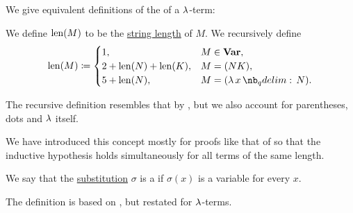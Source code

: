 \begin{definition}\label{def:lambda_term_length}
  We give equivalent definitions of the  of a \( \mathrm{\lambda} \)-term:
  \begin{thmenum}
     We define \( \operatorname{len}(M) \) to be the \hyperref[def:alphabet/length]{string length} of \( M \).
     We recursively define
    \begin{equation*}
      \len(M) \coloneqq \begin{cases}
        1,                     &M \in \op*{Var}, \\
        2 + \len(N) + \len(K), &M = (NK), \\
        5 + \len(N),           &M = (\qabs x N). \\
      \end{cases}
    \end{equation*}
  \end{thmenum}
\end{definition}
\begin{comments}
  \item The recursive definition resembles that by , but we also account for parentheses, dots and \( \mathrm{\lambda} \) itself.
  \item We have introduced this concept mostly for proofs like that of  so that the inductive hypothesis holds simultaneously for all terms of the same length.
\end{comments}

\begin{definition}\label{def:lambda_renaming}
  We say that the \hyperref[def:lambda_substitution]{substitution} \( \sigma \) is a  if \( \sigma(x) \) is a variable for every \( x \).
\end{definition}
\begin{comments}
  \item The definition is based on \cite[252]{Mimram2020}, but restated for \( \mathrm{\lambda} \)-terms.
\end{comments}

